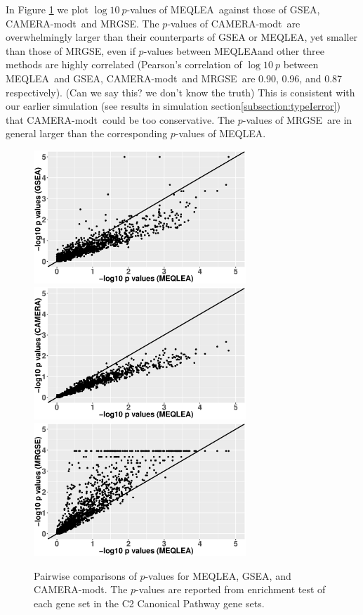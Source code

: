 \documentclass[a4,center,fleqn]{NAR}
\newcommand{\OurMethod}{MEQLEA}
\newcommand{\CMT}{CAMERA-modt}
\newcommand{\genr}{MRGSE}
\begin{document}
	In Figure \ref{fig:HDdatap} we plot $\log 10~p$-values of \OurMethod~against those of GSEA, \CMT~and \genr.
	The $p$-values of \CMT~are overwhelmingly larger than their counterparts of GSEA or \OurMethod, yet 
	smaller than those of \genr, even 
	if $p$-values between \OurMethod and other three methods are highly correlated (Pearson's correlation 
	of $\log 10 ~p$ between \OurMethod~and GSEA, \CMT~and \genr~are 0.90, 0.96, and 0.87 respectively). 
	(Can we say this? we don't know the truth) This is consistent with our earlier simulation (see results in simulation 
	section\ref{subsection:typeIerror}) that
	\CMT~could be too conservative. The $p$-values of \genr~are in general larger than the corresponding
	$p$-values of \OurMethod. 
	\begin{figure}[!ht]
		\begin{center}
			\includegraphics[width=8cm,height=5cm]{Figures/MEQLEA_GSEA.eps}
			\includegraphics[width=8cm,height=5cm]{Figures/MEQLEA_Camera.eps}
			\includegraphics[width=8cm,height=5cm]{Figures/MEQLEA_MRGSE.eps}
		\end{center} 
		\caption{Pairwise comparisons of $p$-values for \OurMethod, GSEA, and \CMT. The $p$-values are
			reported from enrichment test of each gene set in the C2 Canonical Pathway gene sets.
		}\label{fig:HDdatap}
	\end{figure} 
	
\end{document}

